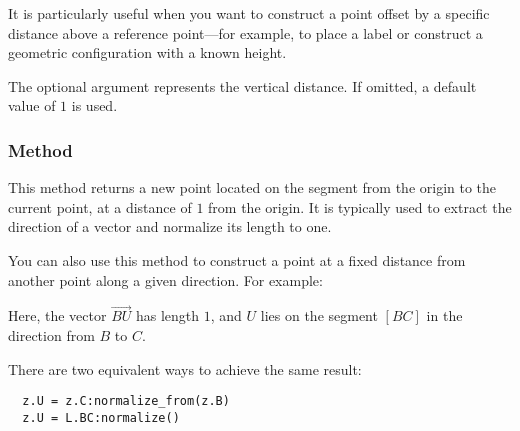 \medskip
\noindent
It is particularly useful when you want to construct a point offset by a specific distance above a reference point—for example, to place a label or construct a geometric configuration with a known height.

\medskip
\noindent
The optional argument  represents the vertical distance. If omitted, a default value of $1$ is used.

\vspace{1em}


\begin{tkzexample}[latex = 7cm]
\begin{center}
\end{center}
\end{tkzexample}


\subsubsection{Method } %
\label{ssub:method_normalize}

This method returns a new point located on the segment from the origin to the current point, at a distance of $1$ from the origin. It is typically used to extract the direction of a vector and normalize its length to one.

\medskip
\noindent
You can also use this method to construct a point at a fixed distance from another point along a given direction. For example:

\begin{center}
\end{center}

\noindent
Here, the vector $\overrightarrow{BU}$ has length $1$, and $U$ lies on the segment $[BC]$ in the direction from $B$ to $C$.

\medskip
\noindent
There are two equivalent ways to achieve the same result:

\begin{mybox}
\begin{verbatim}
  z.U = z.C:normalize_from(z.B)
  z.U = L.BC:normalize()
\end{verbatim}
\end{mybox}

